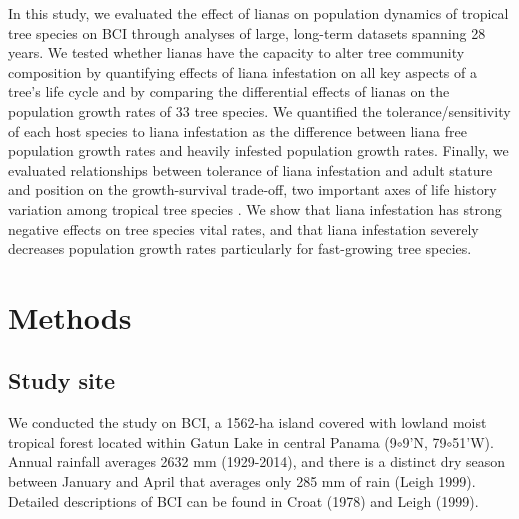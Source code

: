 \documentclass[b5paper,justified]{tufte-book} %
\begin{document}
\begin{fullwidth}
In this study, we evaluated the effect of lianas on population dynamics of tropical tree species on BCI through analyses of large, long-term datasets spanning 28 years. We tested whether lianas have the capacity to alter tree community composition by quantifying effects of liana infestation on all key aspects of a tree's life cycle and by comparing the differential effects of lianas on the population growth rates of 33 tree species. We quantified the tolerance/sensitivity of each host species to liana infestation as the difference between liana free population growth rates and heavily infested population growth rates. Finally, we evaluated relationships between tolerance of liana infestation and adult stature and position on the growth-survival trade-off, two important axes of life history variation among tropical tree species \citep{Kohyama2003, Wright2010}.  We show that liana infestation has strong negative effects on tree species vital rates, and that liana infestation severely decreases population growth rates particularly for fast-growing tree species. 

\section{Methods}

\subsection{Study site}
We conducted the study on BCI, a 1562-ha island covered with lowland moist tropical forest located within Gatun Lake in central Panama (9$\circ$9'N, 79$\circ$51'W). Annual rainfall averages 2632 mm (1929-2014), and there is a distinct dry season between January and April that averages only 285 mm of rain (Leigh 1999). Detailed descriptions of BCI can be found in Croat (1978) and Leigh (1999).  


\end{fullwidth}
\end{document}
